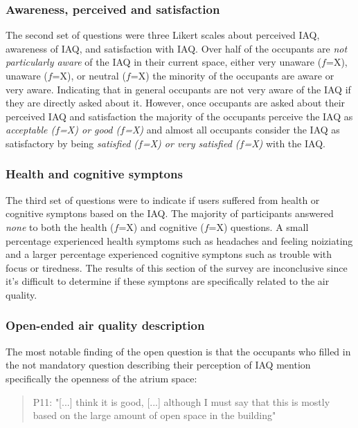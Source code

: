 \subsubsection{Awareness, perceived and satisfaction}

The second set of questions were three Likert scales about perceived IAQ, awareness of IAQ, and satisfaction with IAQ. Over half of the occupants are \textit{not particularly aware} of the IAQ in their current space, either very unaware ($f$=X), unaware ($f$=X), or neutral ($f$=X) the minority of the occupants are aware or very aware. Indicating that in general occupants are not very aware of the IAQ if they are directly asked about it. However, once occupants are asked about their perceived IAQ and satisfaction the majority of the occupants perceive the IAQ as \textit{acceptable ($f$=X) or good ($f$=X)} and almost all occupants consider the IAQ as satisfactory by being \textit{satisfied ($f$=X) or very satisfied ($f$=X)} with the IAQ.

\subsubsection{Health and cognitive symptons}

The third set of questions were to indicate if users suffered from health or cognitive symptons based on the IAQ. The majority of participants answered \textit{none} to both the health ($f$=X) and cognitive ($f$=X) questions. A small percentage experienced health symptoms such as headaches and feeling noiziating and a larger percentage experienced cognitive symptons such as trouble with focus or tiredness. The results of this section of the survey are inconclusive since it's difficult to determine if these symptons are specifically related to the air quality.

\subsubsection{Open-ended air quality description}
The most notable finding of the open question is that the occupants who filled in the not mandatory question describing their perception of IAQ mention specifically the openness of the atrium space:

\begin{quote}
P11: "[...] think it is good, [...] although I must say that this is mostly based on the large amount of open space in the building"
\end{quote}

